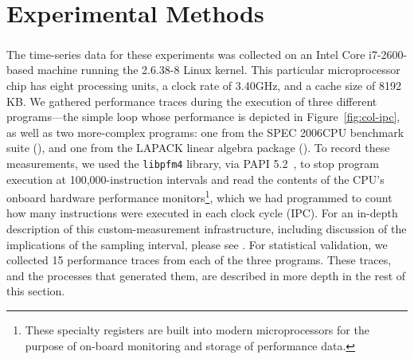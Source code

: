 \section{Experimental Methods}\label{sec:methods}



The time-series data for these experiments was collected on an Intel
Core\textsuperscript{\textregistered} i7-2600-based machine running
the 2.6.38-8 Linux kernel.  This particular microprocessor chip has
eight processing units, a clock rate of 3.40GHz, and a cache size of
8192 KB.  We gathered performance traces during the execution of three
different programs---the simple \col loop whose performance is
depicted in Figure~\ref{fig:col-ipc}, as well as two more-complex
programs: one from the SPEC 2006CPU benchmark suite (\gcc), and one
from the LAPACK linear algebra package (\svd).  To record these
measurements, we used the {\tt libpfm4} library, via PAPI
% 
% 
5.2~\cite{papi}, to stop program execution at 100,000-instruction
intervals and read the contents of the CPU's onboard hardware
performance monitors\footnote{These specialty registers are built into
  modern microprocessors for the purpose of on-board monitoring and
  storage of performance data.}, which we had programmed to count how
many instructions were executed in each clock cycle (IPC).  For an
in-depth description of this custom-measurement infrastructure,
including discussion of the implications of the sampling interval,
please see \cite{zach-IDA10,mytkowicz09,todd-phd}.  For statistical
validation, we collected 15 performance traces from each of the three
programs.  These traces, and the processes that generated them, are
described in more depth in the rest of this section.


